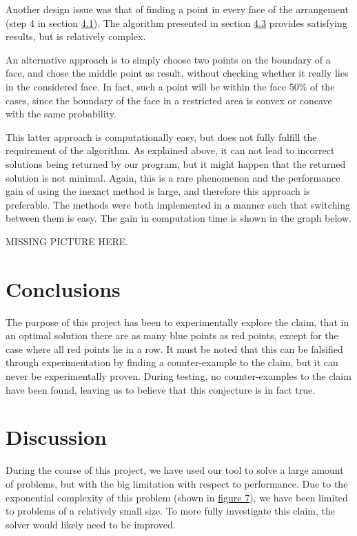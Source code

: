 \documentclass[a4paper,12pt]{article}
\begin{document}
Another design issue was that of finding a point in every face of the arrangement (step 4 in section \hyperref[ref:Algorithm]{4.1}). The algorithm presented in section \hyperref[sec:findPoints]{4.3} provides satisfying results, but is relatively complex.

An alternative approach is to simply choose two points on the boundary of a face, and chose the middle point as result, without checking whether it really lies in the considered face. In fact, such a point will be within the face 50\% of the cases, since the boundary of the face in a restricted area is convex or concave with the same probability. 

This latter approach is computationally easy, but does not fully fulfill the requirement of the algorithm. As explained above, it can not lead to incorrect solutions being returned by our program, but it might happen that the returned solution is not minimal. Again, this is a rare phenomenon and the performance gain of using the inexact method is large, and therefore this approach is preferable. The methods were both implemented in a manner such that switching between them is easy. The gain in computation time is shown in the graph below.

MISSING PICTURE HERE.


\section{Conclusions}
The purpose of this project has been to experimentally explore the claim, that in an optimal solution there are as many blue points as red points, except for the case where all red points lie in a row. It must be noted that this can be falsified through experimentation by finding a counter-example to the claim, but it can never be experimentally proven. During testing, no counter-examples to the claim have been found, leaving us to believe that this conjecture is in fact true.

\section{Discussion}
During the course of this project, we have used our tool to solve a large amount of problems, but with the big limitation with respect to performance. Due to the exponential complexity of this problem (shown in \hyperref[ref:speed] {figure 7}), we have been limited to problems of a relatively small size. To more fully investigate this claim, the solver would likely need to be improved.
\end{document}
